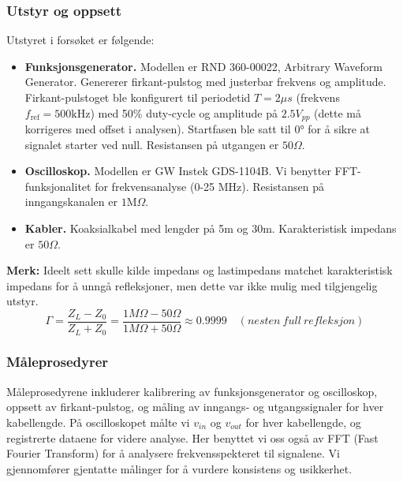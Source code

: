 \subsubsection{Utstyr og oppsett}
Utstyret i forsøket er følgende:\\
\begin{itemize}
    \item \textbf{Funksjonsgenerator.} Modellen er RND 360-00022, Arbitrary Waveform Generator. Genererer firkant-pulstog med justerbar frekvens og amplitude. Firkant-pulstoget ble konfigurert til periodetid $T = 2 \mu s$ (frekvens $f_\mathrm{ref} = 500 \mathrm{kHz}$) med 50\% duty-cycle og amplitude på $2.5V_{pp}$ (dette må korrigeres med offset i analysen). Startfasen ble satt til $0\si{\degree}$ for å sikre at signalet starter ved null. Resistansen på utgangen er $50 \Omega$.\\
    \item \textbf{Oscilloskop.} Modellen er GW Instek GDS-1104B. Vi benytter FFT-funksjonalitet for frekvensanalyse (0-25 MHz). Resistansen på inngangskanalen er $1 \mathrm{M}\Omega$.\\
    \item \textbf{Kabler.} Koaksialkabel med lengder på 5m og 30m. Karakteristisk impedans er $50 \Omega$.\\[1em]
\end{itemize}
\textbf{Merk:} Ideelt sett skulle kilde impedans og lastimpedans matchet karakteristisk impedans for å unngå refleksjoner, men dette var ikke mulig med tilgjengelig utstyr.
\[
    \Gamma = \frac{Z_L - Z_0}{Z_L + Z_0} = \frac{1M\Omega - 50\Omega}{1M\Omega + 50\Omega} \approx 0.9999 \quad (nesten \ full \ refleksjon)
\]

\subsubsection{Måleprosedyrer}
Måleprosedyrene inkluderer kalibrering av funksjonsgenerator og oscilloskop, oppsett av firkant-pulstog, og måling av inngangs- og utgangssignaler for hver kabellengde. På oscilloskopet målte vi $v_{in}$ og $v_{out}$ for hver kabellengde, og registrerte dataene for videre analyse. Her benyttet vi oss også av FFT (Fast Fourier Transform) for å analysere frekvensspekteret til signalene. Vi gjennomfører gjentatte målinger for å vurdere konsistens og usikkerhet.

